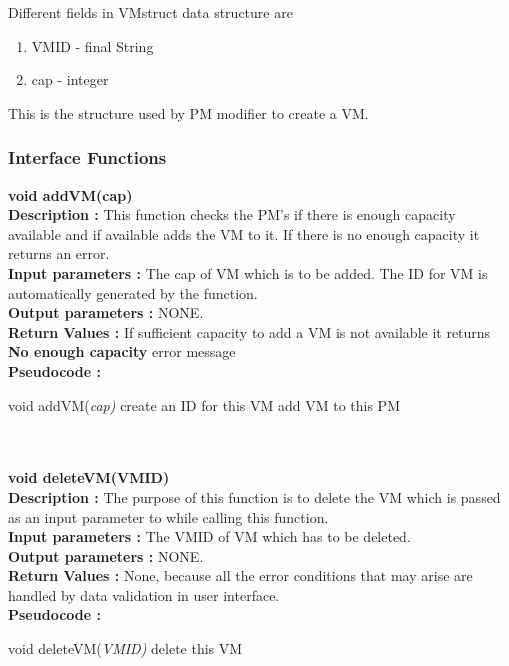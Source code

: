 \documentclass[a4paper,11pt]{article}
\begin{document}
Different fields in VMstruct data structure are
\begin{enumerate}
 \item VM\textunderscore ID - final String
 \item cap - integer
\end{enumerate}
This is the structure used by PM modifier to create a VM.
\subsubsection{Interface Functions}
\textbf{void addVM(cap)}
\\
\textbf{Description :} This function checks the PM's if there is enough capacity available and if available adds the VM to it. If there is no enough capacity 
it returns an error.
\\
\textbf{Input parameters :} The cap of VM which is to be added. The ID for VM is automatically generated by the function.
\\
\textbf{Output parameters :} NONE.
\\
\textbf{Return Values :} If sufficient capacity to add a VM is not available it returns \textbf{No enough capacity} error message
\\
\textbf{Pseudocode :}
\begin{algorithmic}[1]
\STATE void addVM(\emph{cap)}
\STATE create an ID for this VM
\STATE add VM to this PM
\ENDIF
\ENDFOR
\end{algorithmic}
\mbox{}\\\\
\textbf{void deleteVM(VM\textunderscore ID)}
\\
\textbf{Description :} The purpose of this function is to delete the VM which is passed as an input parameter to while calling this function.
\\
\textbf{Input parameters :} The VM\textunderscore ID of VM which has to be deleted.
\\
\textbf{Output parameters :} NONE.
\\
\textbf{Return Values :} None, because all the error conditions that may arise are handled by data validation in user interface.
\\
\textbf{Pseudocode :}
\begin{algorithmic}[1]
\STATE void deleteVM(\emph{VM\textunderscore ID)}
\STATE delete this VM
\ENDIF
\ENDFOR
\ENDFOR
\end{algorithmic}
\end{document}
